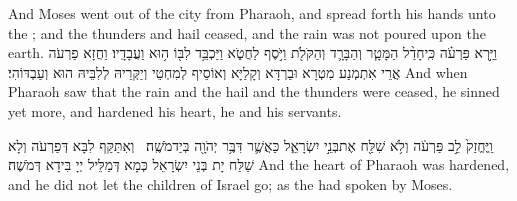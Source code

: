 {And Moses went out of the city from Pharaoh, and spread forth his hands unto the \lord; and the thunders and hail ceased, and the rain was not poured upon the earth.}{}
{וַיַּ֣רְא פַּרְעֹ֗ה כִּֽי\maqqaf חָדַ֨ל הַמָּטָ֧ר וְהַבָּרָ֛ד וְהַקֹּלֹ֖ת וַיֹּ֣סֶף לַחֲטֹ֑א וַיַּכְבֵּ֥ד לִבּ֖וֹ ה֥וּא וַעֲבָדָֽיו׃}
{וַחֲזָא פַרְעֹה אֲרֵי אִתְמְנַע מִטְרָא וּבַרְדָּא וְקָלַיָּא וְאוֹסֵיף לְמִחְטֵי וְיַקְּרֵיהּ לְלִבֵּיהּ הוּא וְעַבְדּוֹהִי׃}
{And when Pharaoh saw that the rain and the hail and the thunders were ceased, he sinned yet more, and hardened his heart, he and his servants.}{}

{וַֽיֶּחֱזַק֙ לֵ֣ב פַּרְעֹ֔ה וְלֹ֥א שִׁלַּ֖ח אֶת\maqqaf בְּנֵ֣י יִשְׂרָאֵ֑ל כַּאֲשֶׁ֛ר דִּבֶּ֥ר יְהֹוָ֖ה בְּיַד\maqqaf מֹשֶֽׁה׃ \petucha }
{וְאִתַּקַּף לִבָּא דְּפַרְעֹה וְלָא שַׁלַּח יָת בְּנֵי יִשְׂרָאֵל כְּמָא דְּמַלֵּיל יְיָ בִּידָא דְּמֹשֶׁה׃}
{And the heart of Pharaoh was hardened, and he did not let the children of Israel go; as the \lord\space had spoken by Moses.}{}

